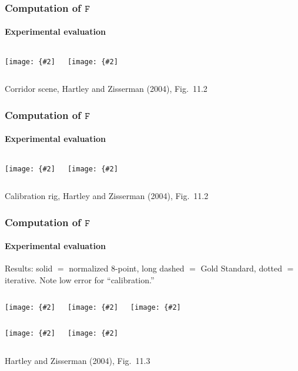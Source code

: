 \documentclass[aspectratio=169]{beamer}
\newcommand{\mat}[1]{\mathtt{#1}}
\newcommand{\myfig}[3]{\centerline{\texttt{[image: \{\#2]}}}
    \centerline{\scriptsize #3}}
\begin{document}
\begin{frame}
\frametitle{Computation of $\mat{F}$}
\framesubtitle{Experimental evaluation}

\begin{columns}
\column{2in}
\myfig{1.9in}{HZ-fig10-2g}{}
\column{2in}
\myfig{1.9in}{HZ-fig10-2h}{}
\end{columns}

\centerline{\scriptsize Corridor scene, Hartley and Zisserman (2004),
Fig.\ 11.2}

\end{frame}

\begin{frame}
\frametitle{Computation of $\mat{F}$}
\framesubtitle{Experimental evaluation}

\begin{columns}
\column{2in}
\myfig{1.9in}{HZ-fig10-2i}{}
\column{2in}
\myfig{1.9in}{HZ-fig10-2j}{}
\end{columns}

\centerline{\scriptsize Calibration rig, Hartley and Zisserman (2004),
Fig.\ 11.2}

\end{frame}

\begin{frame}
\frametitle{Computation of $\mat{F}$}
\framesubtitle{Experimental evaluation}

Results: solid $=$ normalized 8-point, long dashed $=$ Gold Standard,
dotted $=$ iterative.  Note low error for ``calibration.''

\medskip

\begin{columns}
\column{1.5in}
\myfig{1.4in}{HZ-fig10-3a}{}
\column{1.5in}
\myfig{1.4in}{HZ-fig10-3b}{}
\column{1.5in}
\myfig{1.4in}{HZ-fig10-3c}{}
\end{columns}

\vspace{-.1in}

\begin{columns}
\column{1.5in}
\myfig{1.4in}{HZ-fig10-3d}{}
\column{1.5in}
\myfig{1.4in}{HZ-fig10-3e}{}
\end{columns}

\vspace{-.1in}

\centerline{\scriptsize Hartley and Zisserman (2004), Fig.\ 11.3}

\end{frame}
\end{document}
